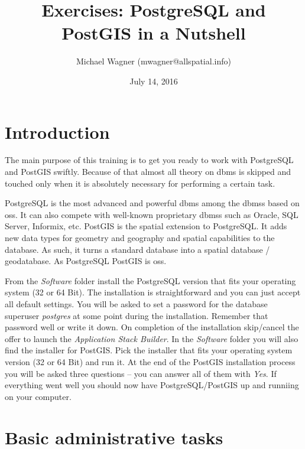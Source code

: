 \documentclass[a4paper,12pt,titlepage]{article}
\title{Exercises: PostgreSQL and PostGIS in a Nutshell}
\author{Michael Wagner (mwagner@allspatial.info)}
\date{July 14, 2016}
\begin{document}
             										
\maketitle                   										

\tableofcontents
\listoffigures
\lstlistoflistings
\newpage
\printglossary[type=\acronymtype,title={List of Abbreviations}]
\newpage

\section{Introduction}

The main purpose of this training is to get you ready to work with PostgreSQL and PostGIS swiftly. Because of that almost all theory on \gls{dbms} is skipped and touched only when it is absolutely necessary for performing a certain task.

PostgreSQL is the most advanced and powerful \gls{dbms} among the \gls{dbms}s based on \gls{oss}. It can also compete with well-known proprietary \gls{dbms}s such as Oracle, SQL Server, Informix, etc. PostGIS is the spatial extension to PostgreSQL. It adds new data types for geometry and geography and spatial capabilities to the database. As such, it turns a standard database into a spatial database / geodatabase. As PostgreSQL PostGIS is \gls{oss}.

From the \textit{Software} folder install the PostgreSQL version that fits your operating system (32 or 64 Bit). The installation is straightforward and you can just accept all default settings. You will be asked to set a password for the database superuser \textit{postgres} at some point during the installation. Remember that password well or write it down. On completion of the installation skip/cancel the offer to launch the \textit{Application Stack Builder}. In the \textit{Software} folder you will also find the installer for PostGIS. Pick the installer that fits your operating system version (32 or 64 Bit) and run it. At the end of the PostGIS installation process you will be asked three questions -- you can answer all of them with \textit{Yes}. If everything went well you should now have PostgreSQL/PostGIS up and runniing on your computer.

\section{Basic administrative tasks}
\end{document}
